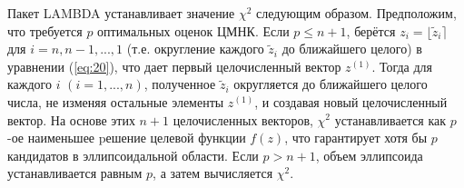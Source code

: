 \documentclass[12pt]{matmex-diploma}
\begin{document}
Пакет LAMBDA устанавливает значение $\chi^2$ следующим образом.
Предположим, что требуется $p$ оптимальных оценок ЦМНК. Если $p \leq n + 1$,
берётся $z_i = \lfloor \tilde{z}_i \rceil $ для $i = n, n − 1,. . . , 1$
(т.е. округление каждого $\tilde{z}_i$ до ближайшего целого) в уравнении 
(\ref{eq:20}), что дает первый целочисленный вектор $z^{(1)}$.
Тогда для каждого $i$ $(i = 1, ..., n)$,
полученное $\tilde{z}_i$ округляется до ближайшего целого числа, не изменяя 
остальные элементы $z^{(1)}$, и создавая новый целочисленный вектор. 
На основе этих $n + 1$ целочисленных векторов, $\chi^2$ устанавливается как $p$-ое
наименьшее pешение целевой функции $f (z)$,
что гарантирует хотя бы $p$ кандидатов в эллипсоидальной области.
Если $p > n + 1$, объем эллипсоида устанавливается равным
$p$, а затем вычисляется $\chi^2$.
\end{document}
